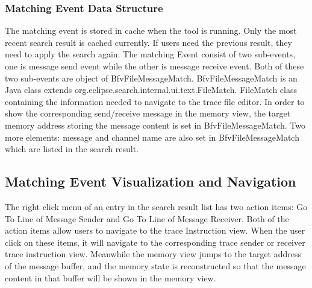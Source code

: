 \subsubsection{Matching Event Data Structure}
The matching event is stored in cache when the tool is running. Only the most recent search result is cached currently. If users need the previous result, they need to apply the search again. The matching Event consist of two sub-events, one is message send event while the other is message receive event. Both of these two sub-events are object of BfvFileMessageMatch. BfvFileMessageMatch is an Java class extends org.eclipse.search.internal.ui.text.FileMatch. FileMatch class containing the information needed to navigate to the trace file editor. In order to show the corresponding send/receive message in the memory view, the target memory address storing the message content is set in BfvFileMessageMatch. Two more elements: message and channel name are also set in BfvFileMessageMatch which are listed in the search result. 

\subsection{Matching Event Visualization and Navigation}
The right click menu of an entry in the search result list has two action items: Go To Line of Message Sender and Go To Line of Message Receiver. Both of the action items allow users to navigate to the trace Instruction view. When the user click on these items, it will navigate to the corresponding trace sender or receiver trace instruction view.  Meanwhile the memory view jumps to the target address of the message buffer, and the memory state is reconstructed so that the message content in that buffer will be shown in the memory view.


